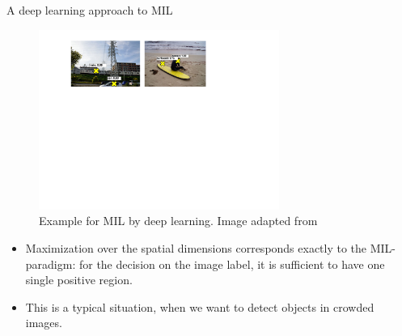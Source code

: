 \documentclass[xcolor=pdftex,dvipsnames,table]{beamer}
\begin{document}
\begin{frame}{A deep learning approach to MIL}
\begin{figure}[htb]
   \centering
   \includegraphics[width=0.7\textwidth]{../graphics/example_res_simple_wsl.pdf}
   \caption{Example for MIL by deep learning. Image adapted from \cite{Oquab2015}}
\end{figure}
\begin{itemize}
\item Maximization over the spatial dimensions corresponds exactly to the MIL-paradigm: for the decision on the image label, it is sufficient to have one single positive region. 
\item This is a typical situation, when we want to detect objects in crowded images. 
\end{itemize}
\end{frame}

\end{document}
